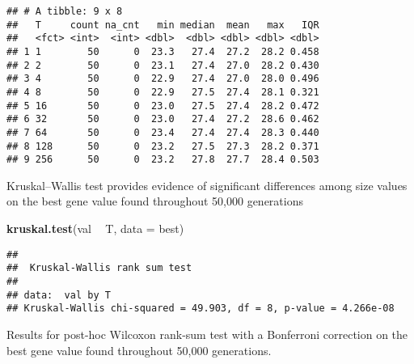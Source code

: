 \documentclass[]{book}
\newenvironment{Shaded}{\begin{snugshade}}{\end{snugshade}}
\newcommand{\DataTypeTok}[1]{\textcolor[rgb]{0.13,0.29,0.53}{#1}}
\newcommand{\KeywordTok}[1]{\textcolor[rgb]{0.13,0.29,0.53}{\textbf{#1}}}
\newcommand{\NormalTok}[1]{#1}
\newcommand{\OperatorTok}[1]{\textcolor[rgb]{0.81,0.36,0.00}{\textbf{#1}}}
\newcommand{\OtherTok}[1]{\textcolor[rgb]{0.56,0.35,0.01}{#1}}
\newcommand{\StringTok}[1]{\textcolor[rgb]{0.31,0.60,0.02}{#1}}
\begin{document}
\begin{verbatim}
## # A tibble: 9 x 8
##   T     count na_cnt   min median  mean   max   IQR
##   <fct> <int>  <int> <dbl>  <dbl> <dbl> <dbl> <dbl>
## 1 1        50      0  23.3   27.4  27.2  28.2 0.458
## 2 2        50      0  23.1   27.4  27.0  28.2 0.430
## 3 4        50      0  22.9   27.4  27.0  28.0 0.496
## 4 8        50      0  22.9   27.5  27.4  28.1 0.321
## 5 16       50      0  23.0   27.5  27.4  28.2 0.472
## 6 32       50      0  23.0   27.4  27.2  28.6 0.462
## 7 64       50      0  23.4   27.4  27.4  28.3 0.440
## 8 128      50      0  23.2   27.5  27.3  28.2 0.371
## 9 256      50      0  23.2   27.8  27.7  28.4 0.503
\end{verbatim}

Kruskal--Wallis test provides evidence of significant differences among size values on the best gene value found throughout 50,000 generations

\begin{Shaded}
\begin{Highlighting}[]
\KeywordTok{kruskal.test}\NormalTok{(val }\OperatorTok{~}\StringTok{ }\NormalTok{T, }\DataTypeTok{data =}\NormalTok{ best)}
\end{Highlighting}
\end{Shaded}

\begin{verbatim}
## 
##  Kruskal-Wallis rank sum test
## 
## data:  val by T
## Kruskal-Wallis chi-squared = 49.903, df = 8, p-value = 4.266e-08
\end{verbatim}

Results for post-hoc Wilcoxon rank-sum test with a Bonferroni correction on the best gene value found throughout 50,000 generations.

\begin{Shaded}
\end{Shaded}
\end{document}
